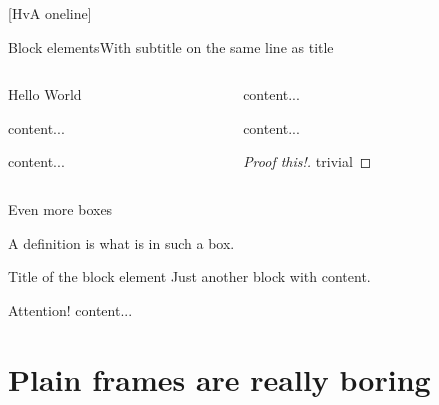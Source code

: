\documentclass[pdf]{beamer}
\begin{document}
{ %
	[HvA oneline]

	\begin{frame}{Block elements}{With subtitle on the same line as title}
		\begin{columns}[t]
			\begin{column}{0.45\textwidth}
				\begin{example}
					Hello World
				\end{example}
				\begin{theorem}
					content...
				\end{theorem}
				\begin{corollary}
					content...
				\end{corollary}
			\end{column}
			\begin{column}{0.45\textwidth}
				\begin{fact}
					content...
				\end{fact}
				\begin{lemma}
					content...
				\end{lemma}
				\begin{proof}[Proof \alert{this!}]
					trivial
				\end{proof}
			\end{column}
		\end{columns}
	\end{frame}
}

\begin{frame}{Even more boxes}

	\begin{definition}[of a definition]
		A \alert{definition} is what is in such a box.
	\end{definition}
	\begin{block}{Title of the block element}
		Just another block with content.
	\end{block}
	\begin{alertblock}{Attention!}
		content...
	\end{alertblock}
	
\end{frame}

\section{Plain frames are really boring}
\end{document}
